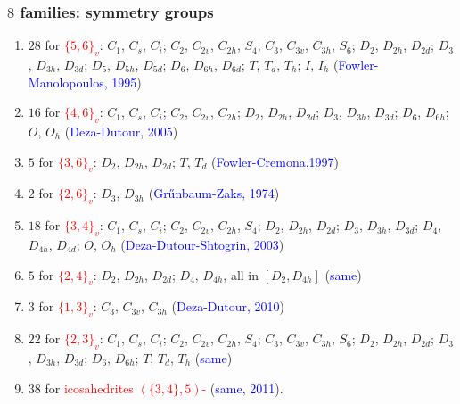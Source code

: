 \documentclass{beamer}
\begin{document}
\begin{frame}\frametitle{$8$ families: symmetry  groups}
\vspace{-2mm}

\begin{enumerate}
\item[\ding{108}] $28$ for \textcolor{red}{$\{5,6\}_v$}:  
$C_1$, $C_s$, $C_i$; $C_2$, $C_{2v}$, $C_{2h}$, $S_4$; $C_3$,
$C_{3v}$, $C_{3h}$, $S_6$; $D_2$, $D_{2h}$, $D_{2d}$; $D_3$,  
$D_{3h}$, $D_{3d}$; $D_5$, $D_{5h}$, $D_{5d}$; $D_6$, $D_{6h}$,
$D_{6d}$; $T$, $T_d$, $T_h$; $I$, $I_h$ 
(\textcolor{blue}{Fowler-Manolopoulos, 1995})
\item[\ding{108}]  $16$ for \textcolor{red}{$\{4,6\}_v$}: $C_1$, $C_s$,
$C_{i}$; $C_2$, $C_{2v}$, $C_{2h}$; $D_2$, $D_{2h}$, $D_{2d}$; $D_3$,
$D_{3h}$, $D_{3d}$; $D_6$, $D_{6h}$; $O$, $O_h$
(\textcolor{blue}{Deza-Dutour,  2005})
\item[\ding{108}]  $5$ for \textcolor{red}{$\{3,6\}_v$}: $D_{2}$,
$D_{2h}$, $D_{2d}$; $T$, $T_d$ (\textcolor{blue}{Fowler-Cremona,1997})
\item[\ding{108}]  $2$ for \textcolor{red}{$\{2, 6\}_v$}: $D_3$, $D_{3h}$ 
(\textcolor{blue}{Gr\H{u}nbaum-Zaks, 1974})
\item[\ding{108}]  $18$ for \textcolor{red}{$\{3, 4\}_v$}: $C_{1}$, $C_s$,
$C_i$; $C_2$, $C_{2v}$, $C_{2h}$, $S_4$; $D_2$, $D_{2h}$, $D_{2d}$;
$D_3$, $D_{3h}$, $D_{3d}$; $D_4$,
$D_{4h}$, $D_{4d}$; $O$, $O_h$   
(\textcolor{blue}{Deza-Dutour-Shtogrin, 2003})
\item[\ding{108}]  $5$ for \textcolor{red}{$\{2, 4\}_v$}: $D_2$, $D_{2h}$, 
$D_{2d}$; $D_4$, $D_{4h}$, all in $[D_2,D_{4h}]$ (\textcolor{blue}{same})
\item[\ding{108}] $3$ for \textcolor{red}{$\{1, 3\}_v$}:  $C_3$,
$C_{3v}$,  $C_{3h}$ (\textcolor{blue}{Deza-Dutour,  2010})
\item[\ding{108}]  $22$ for \textcolor{red}{$\{2, 3\}_v$}: $C_1$, 
$C_s$, $C_i$; $C_2$, $C_{2v}$, $C_{2h}$,  $S_4$; $C_3$,
$C_{3v}$, $C_{3h}$, $S_6$; $D_2$, $D_{2h}$, $D_{2d}$; $D_3$,
$D_{3h}$, $D_{3d}$; $D_6$, $D_{6h}$; $T$, $T_d$, $T_h$ 
(\textcolor{blue}{same}) 
\item $38$ for  \textcolor{red}{icosahedrites $(\{3,4\},5)$-} 
(\textcolor{blue}{same, 2011}).

\end{enumerate}
\end{frame}
\end{document}
